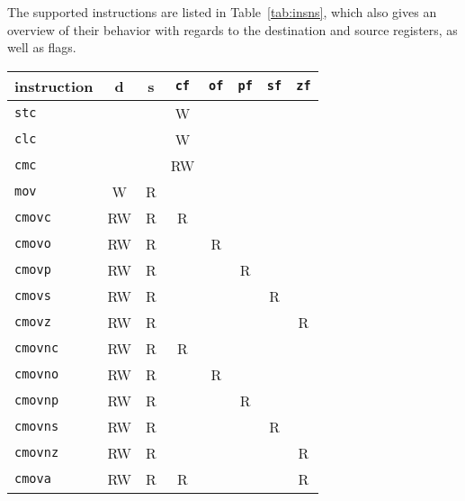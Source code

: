 \documentclass[a4paper,11pt]{kth-mag}
\begin{document}


The supported instructions are listed in Table~\ref{tab:insns}, which also gives an overview of their behavior with regards to the destination and source registers, as well as flags.

\begin{table}
\centering
\begin{tabular}{l|cc|ccccc}
instruction   & d  & s  & \verb|cf| & \verb|of| & \verb|pf| & \verb|sf| & \verb|zf| \\
\hline
\verb|stc|    &    &    & W         &           &           &           &           \\
\verb|clc|    &    &    & W         &           &           &           &           \\
\verb|cmc|    &    &    & RW        &           &           &           &           \\
\hline
\verb|mov|    & W  & R  &           &           &           &           &           \\
\verb|cmovc|  & RW & R  & R         &           &           &           &           \\
\verb|cmovo|  & RW & R  &           & R         &           &           &           \\
\verb|cmovp|  & RW & R  &           &           & R         &           &           \\
\verb|cmovs|  & RW & R  &           &           &           & R         &           \\
\verb|cmovz|  & RW & R  &           &           &           &           & R         \\
\verb|cmovnc| & RW & R  & R         &           &           &           &           \\
\verb|cmovno| & RW & R  &           & R         &           &           &           \\
\verb|cmovnp| & RW & R  &           &           & R         &           &           \\
\verb|cmovns| & RW & R  &           &           &           & R         &           \\
\verb|cmovnz| & RW & R  &           &           &           &           & R         \\
\verb|cmova|  & RW & R  & R         &           &           &           & R         \\

\end{tabular}
\end{table}
\end{document}
